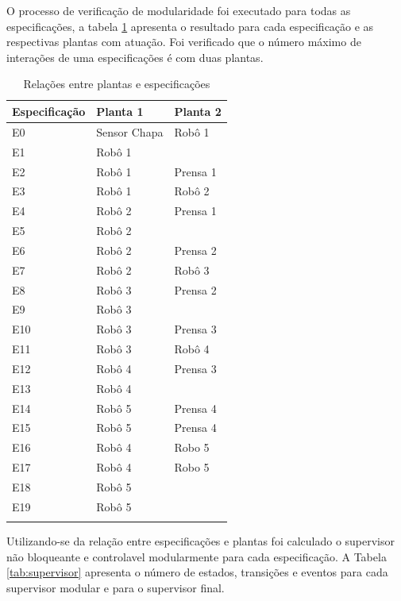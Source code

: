 O processo de verificação de modularidade foi executado para todas as especificações, a tabela \ref{tab:modulos} apresenta o resultado para cada especificação e as respectivas plantas com atuação.
Foi verificado que o número máximo de interações de uma especificações é com duas plantas.

\begin{table}[h]%
\begin{center}
\begin{minipage}{0.5\textwidth}
\caption{Relações entre plantas e especificações}
\label{tab:modulos}
\begin{tabular}{@{}lll@{}}
  \toprule
  Especificação &  Planta 1 & Planta 2\\
  \midrule
  E0 & Sensor Chapa & Robô 1\\
  E1 & Robô 1 & \\
  E2 & Robô 1 & Prensa 1\\
  E3 & Robô 1 & Robô 2\\
  E4 & Robô 2 & Prensa 1\\
  E5 & Robô 2 & \\
  E6 & Robô 2 & Prensa 2\\
  E7 & Robô 2 & Robô 3\\
  E8 & Robô 3 & Prensa 2\\
  E9 & Robô 3 & \\
  E10 & Robô 3 & Prensa 3\\
  E11 & Robô 3 & Robô 4\\
  E12 & Robô 4 & Prensa 3\\
  E13 & Robô 4 & \\
  E14 & Robô 5 & Prensa 4\\
  E15 & Robô 5 & Prensa 4\\
  E16 & Robô 4 & Robo 5\\
  E17 & Robô 4 & Robo 5\\
  E18 & Robô 5 & \\
  E19 & Robô 5 & \\
  \botrule
\end{tabular}
\end{minipage}
\end{center}
\end{table}

Utilizando-se da relação entre especificações e plantas foi calculado o supervisor não bloqueante e controlavel modularmente para cada especificação.
A Tabela \ref{tab:supervisor} apresenta o número de estados, transições e eventos para cada supervisor modular e para o supervisor final.

